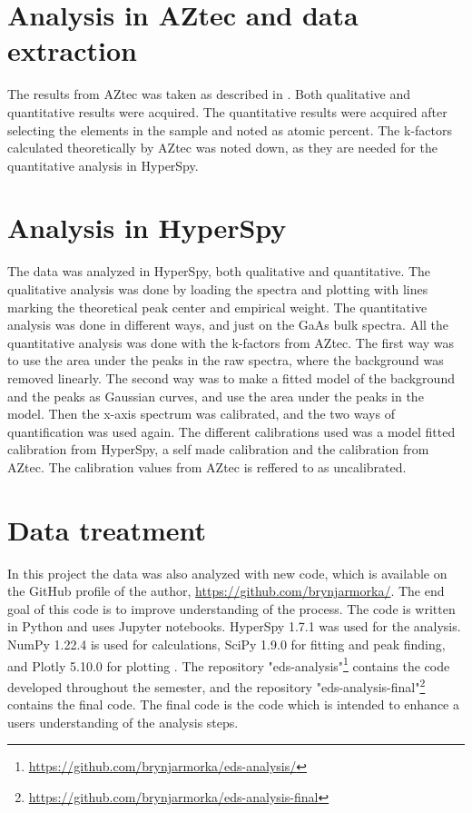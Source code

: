 

%
%
\section{Analysis in AZtec and data extraction}
\label{sec:method:aztec}
The results from AZtec was taken as described in \cite[Appendix A]{lundeby_improving_2019}.
Both qualitative and quantitative results were acquired.
The quantitative results were acquired after selecting the elements in the sample and noted as atomic percent.
The k-factors calculated theoretically by AZtec was noted down, as they are needed for the quantitative analysis in HyperSpy.



%
%
\section{Analysis in HyperSpy}
\label{sec:method:hspy}
The data was analyzed in HyperSpy, both qualitative and quantitative.
The qualitative analysis was done by loading the spectra and plotting with lines marking the theoretical peak center and empirical weight.
The quantitative analysis was done in different ways, and just on the GaAs bulk spectra.
All the quantitative analysis was done with the k-factors from AZtec.
The first way was to use the area under the peaks in the raw spectra, where the background was removed linearly.
The second way was to make a fitted model of the background and the peaks as Gaussian curves, and use the area under the peaks in the model.
Then the x-axis spectrum was calibrated, and the two ways of quantification was used again.
The different calibrations used was a model fitted calibration from HyperSpy, a self made calibration and the calibration from AZtec.
The calibration values from AZtec is reffered to as uncalibrated.


%
%
\section{Data treatment}
\label{sec:method:treatment}
In this project the data was also analyzed with new code, which is available on the GitHub profile of the author, \url{https://github.com/brynjarmorka/}.
The end goal of this code is to improve understanding of the process.
The code is written in Python and uses Jupyter notebooks.
HyperSpy 1.7.1 was used for the analysis.
NumPy 1.22.4 is used for calculations, SciPy 1.9.0 for fitting and peak finding, and Plotly 5.10.0 for plotting .
The repository "eds-analysis"\footnote{\url{https://github.com/brynjarmorka/eds-analysis/}} contains the code developed throughout the semester, and the repository "eds-analysis-final"\footnote{\url{https://github.com/brynjarmorka/eds-analysis-final}} contains the final code.
The final code is the code which is intended to enhance a users understanding of the analysis steps.

